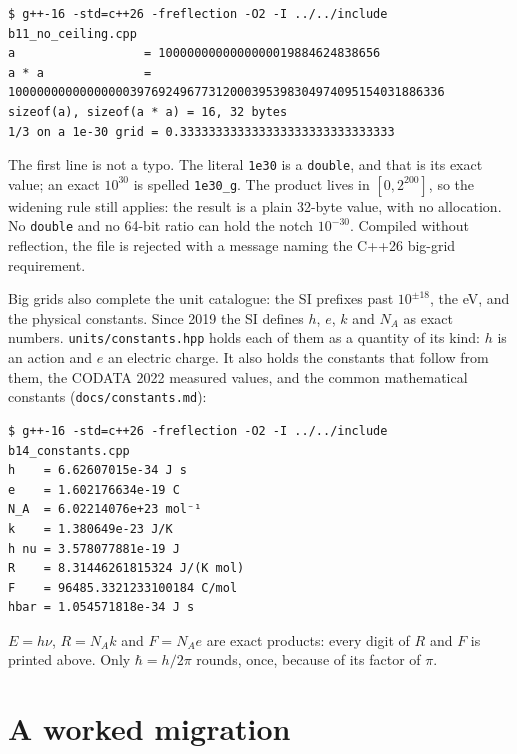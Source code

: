 \documentclass[11pt,a4paper]{article}
\newcommand{\code}[1]{\texttt{\small #1}}
\newcommand{\file}[1]{\texttt{\small #1}}
\begin{document}

\begin{lstlisting}[style=term]
$ g++-16 -std=c++26 -freflection -O2 -I ../../include b11_no_ceiling.cpp
a                  = 1000000000000000019884624838656
a * a              = 1000000000000000039769249677312000395398304974095154031886336
sizeof(a), sizeof(a * a) = 16, 32 bytes
1/3 on a 1e-30 grid = 0.333333333333333333333333333333
\end{lstlisting}

\noindent
The first line is not a typo. The literal \code{1e30} is a \code{double}, and
that is its exact value; an exact $10^{30}$ is spelled \code{1e30\_g}. The
product lives in $[0, 2^{200}]$, so the widening rule still applies: the result
is a plain 32-byte value, with no allocation. No \code{double} and no 64-bit
ratio can hold the notch $10^{-30}$. Compiled without reflection, the file is
rejected with a message naming the C++26 big-grid requirement.

Big grids also complete the unit catalogue: the SI prefixes past
$10^{\pm18}$, the eV, and the physical constants. Since 2019 the SI defines
$h$, $e$, $k$ and $N_A$ as exact numbers. \file{units/constants.hpp} holds each of
them as a quantity of its kind: $h$ is an action and $e$ an electric charge.
It also holds the constants that follow from them, the CODATA 2022 measured
values, and the common mathematical constants (\file{docs/constants.md}):


\begin{lstlisting}[style=term]
$ g++-16 -std=c++26 -freflection -O2 -I ../../include b14_constants.cpp
h    = 6.62607015e-34 J s
e    = 1.602176634e-19 C
N_A  = 6.02214076e+23 mol⁻¹
k    = 1.380649e-23 J/K
h nu = 3.578077881e-19 J
R    = 8.31446261815324 J/(K mol)
F    = 96485.3321233100184 C/mol
hbar = 1.054571818e-34 J s
\end{lstlisting}

\noindent
$E = h\nu$, $R = N_A k$ and $F = N_A e$ are exact products: every digit of
$R$ and $F$ is printed above. Only $\hbar = h/2\pi$ rounds, once, because
of its factor of $\pi$.

\section{A worked migration}\label{sec:migration}
\end{document}

